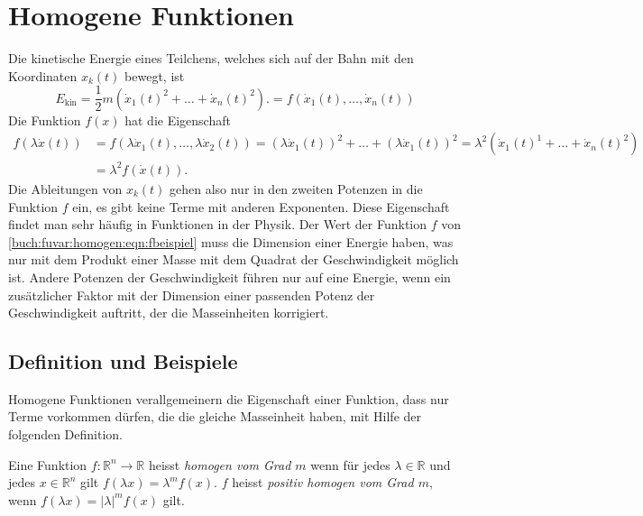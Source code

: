 %
%
%
\section{Homogene Funktionen
\label{buch:fuvar:section:homogen}}
Die kinetische Energie eines Teilchens, welches sich auf der 
Bahn mit den Koordinaten $x_k(t)$ bewegt, ist
\begin{equation}
E_{\text{kin}}
=
\frac12 m (\dot{x}_1(t)^2 + \dots + \dot{x}_n(t)^2).
=
f(\dot{x}_1(t),\dots,\dot{x}_n(t))
\label{buch:fuvar:homogen:eqn:fbeispiel}
\end{equation}
Die Funktion $f(x)$ hat die Eigenschaft
\begin{align*}
f(\lambda \dot{x}(t))
&=
f(\lambda \dot{x}_1(t),\dots,\lambda\dot{x}_2(t))
=
(\lambda\dot{x}_1(t))^2
+\ldots+
(\lambda\dot{x}_1(t))^2
=
\lambda^2(\dot{x}_1(t)^1+\ldots+\dot{x}_n(t)^2)
\\
&=
\lambda^2f(\dot{x}(t)).
\end{align*}
Die Ableitungen von $x_k(t)$ gehen also nur in den zweiten Potenzen
in die Funktion $f$ ein, es gibt keine Terme mit anderen Exponenten.
Diese Eigenschaft findet man sehr häufig in Funktionen in der Physik.
Der Wert der Funktion $f$ von \eqref{buch:fuvar:homogen:eqn:fbeispiel}
muss die Dimension einer Energie haben, was nur mit dem Produkt einer
Masse mit dem Quadrat der Geschwindigkeit möglich ist.
Andere Potenzen der Geschwindigkeit führen nur auf eine Energie, wenn
ein zusätzlicher Faktor mit der Dimension einer passenden Potenz der
Geschwindigkeit auftritt, der die Masseinheiten korrigiert.

%
%
\subsection{Definition und Beispiele}
Homogene Funktionen verallgemeinern die Eigenschaft einer Funktion,
dass nur Terme vorkommen dürfen, die die gleiche Masseinheit haben,
mit Hilfe der folgenden Definition.

\begin{definition}
%
Eine Funktion $f\colon \mathbb{R}^n\to\mathbb{R}$ heisst {\em homogen
vom Grad $m$} wenn für jedes $\lambda\in\mathbb{R}$ und jedes
$x\in\mathbb{R}^n$ gilt $f(\lambda x) = \lambda^m f(x)$.
$f$ heisst {\em positiv homogen vom Grad $m$}, wenn
$f(\lambda x) = |\lambda|^m f(x)$ gilt.
\end{definition}

